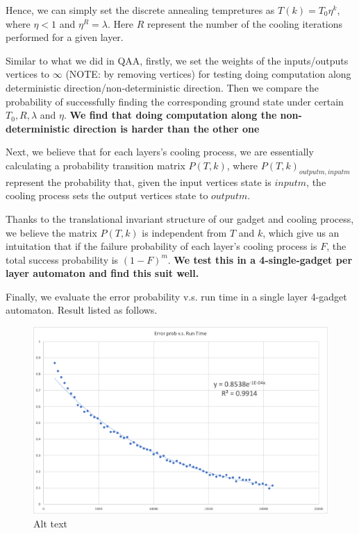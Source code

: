 \documentclass[twocolumn,superscriptaddress,english,showpacs,longbibliography]{revtex4-2}
\begin{document}
Hence, we can simply set the discrete annealing tempretures as
$T(k) = T_0 \eta^k$, where $\eta < 1$ and $\eta ^R = \lambda$.
Here $R$ represent the number of the cooling iterations performed for
a given layer.

Similar to what we did in QAA, firstly, we set the weights of the
inputs/outputs vertices to $\infty$ (NOTE: by removing vertices) for
testing doing computation along deterministic
direction/non-deterministic direction. Then we compare the probability
of successfully finding the corresponding ground state under certain
$T_0, R, \lambda$ and $\eta$. \textbf{We find that doing computation
along the non-deterministic direction is harder than the other one}

Next, we believe that for each layers's cooling process, we are
essentially calculating a probability transition matrix $P(T,k)$,
where $P(T,k)_{outputm, inputm}$ represent the probability that, given
the input vertices state is $inputm$, the cooling process sets the
output vertices state to $outputm$.

Thanks to the translational invariant structure of our gadget and
cooling process, we believe the matrix $P(T,k)$ is independent from
$T$ and $k$, which give us an intuitation that if the failure
probability of each layer's cooling process is $F$, the total success
probability is $(1-F)^m$. \textbf{We test this in a 4-single-gadget
per layer automaton and find this suit well.}

Finally, we evaluate the error probability v.s. run time in a single
layer 4-gadget automaton. Result listed as follows.

\begin{figure}
\centering
\includegraphics[width=\columnwidth]{../notes/images/error vs runtime.png}
\caption{Alt text}
\end{figure}
\end{document}
